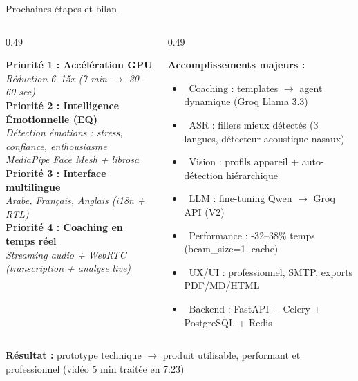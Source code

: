\documentclass[10pt,aspectratio=169]{beamer}
\newcommand{\cmark}{\textcolor{success}{\ding{51}}}
\begin{document}
\begin{frame}{Prochaines étapes et bilan}
\begin{columns}[T]
\begin{column}{0.49\textwidth}
\begin{tcolorbox}[title=Prochaines étapes, colframe=accent, colback=accent!3]
\small
\textbf{Priorité 1 : Accélération GPU}\\
\textit{Réduction 6--15x (7 min $\rightarrow$ 30--60 sec)}\\
\vspace{0.1cm}
\textbf{Priorité 2 : Intelligence Émotionnelle (EQ)}\\
\textit{Détection émotions : stress, confiance, enthousiasme}\\
\textit{MediaPipe Face Mesh + librosa}\\
\vspace{0.1cm}
\textbf{Priorité 3 : Interface multilingue}\\
\textit{Arabe, Français, Anglais (i18n + RTL)}\\
\vspace{0.1cm}
\textbf{Priorité 4 : Coaching en temps réel}\\
\textit{Streaming audio + WebRTC (transcription + analyse live)}
\end{tcolorbox}
\end{column}
\begin{column}{0.49\textwidth}
\begin{tcolorbox}[title=Bilan de cette phase, colframe=success, colback=success!3]
\small
\textbf{Accomplissements majeurs :}
\begin{itemize}
    \item \cmark~Coaching : templates $\rightarrow$ agent dynamique (Groq Llama 3.3)
    \item \cmark~ASR : fillers mieux détectés (3 langues, détecteur acoustique nasaux)
    \item \cmark~Vision : profils appareil + auto-détection hiérarchique
    \item \cmark~LLM : fine-tuning Qwen $\rightarrow$ Groq API (V2)
    \item \cmark~Performance : -32--38\% temps (beam\_size=1, cache)
    \item \cmark~UX/UI : professionnel, SMTP, exports PDF/MD/HTML
    \item \cmark~Backend : FastAPI + Celery + PostgreSQL + Redis
\end{itemize}
\end{tcolorbox}
\end{column}
\end{columns}
\vspace{0.3cm}
\begin{keybox}
\textbf{Résultat :} prototype technique $\rightarrow$ produit utilisable, performant et professionnel (vidéo 5 min traitée en 7:23)
\end{keybox}
\end{frame}
\end{document}
